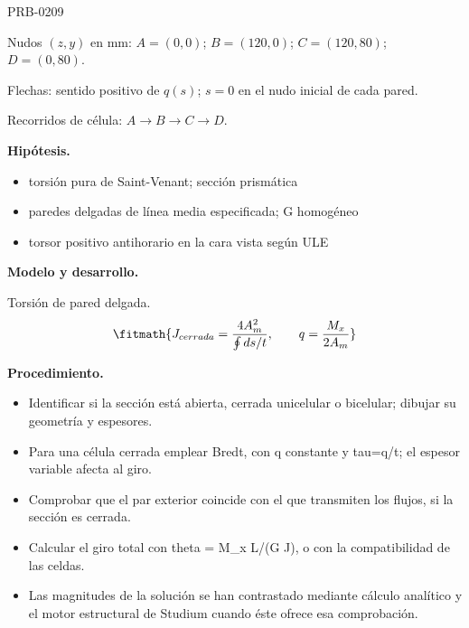\begin{studiumworked}{PRB-0209}
\par\medskip\noindent\begin{minipage}{\linewidth}\centering
{}
\par\small Nudos $(z,y)$ en mm: $A=(0,0)$; $B=(120,0)$; $C=(120,80)$; $D=(0,80)$.
\par\small Flechas: sentido positivo de $q(s)$; $s=0$ en el nudo inicial de cada pared.
\par\small Recorridos de célula: $A\to B\to C\to D$.
\par\normalsize\end{minipage}\par\medskip

\textbf{Hipótesis.}\begin{itemize}\item torsión pura de Saint-Venant; sección prismática
\item paredes delgadas de línea media especificada; G homogéneo
\item torsor positivo antihorario en la cara vista según ULE\end{itemize}

\textbf{Modelo y desarrollo.}

Torsión de pared delgada.\[\fitmath{J_{cerrada}=\frac{4A_m^2}{\oint ds/t},\qquad q=\frac{M_x}{2A_m}}\]

\textbf{Procedimiento.}\begin{itemize}\item Identificar si la sección está abierta, cerrada unicelular o bicelular; dibujar su geometría y espesores.
\item Para una célula cerrada emplear Bredt, con q constante y tau=q/t; el espesor variable afecta al giro.
\item Comprobar que el par exterior coincide con el que transmiten los flujos, si la sección es cerrada.
\item Calcular el giro total con theta = M\_x L/(G J), o con la compatibilidad de las celdas.
\item Las magnitudes de la solución se han contrastado mediante cálculo analítico y el motor estructural de Studium cuando éste ofrece esa comprobación.\end{itemize}


\end{studiumworked}
